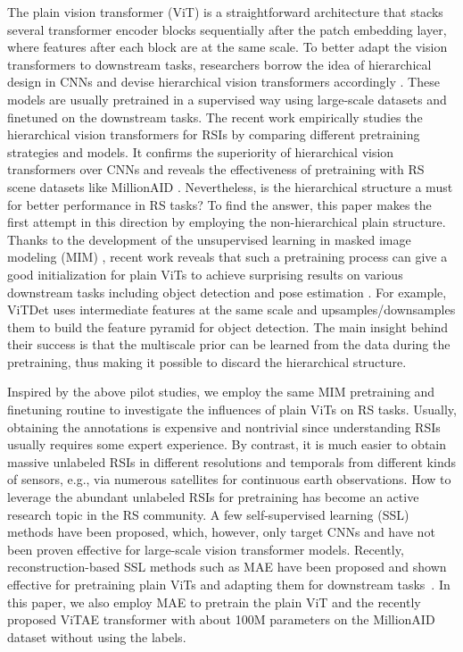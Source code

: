 \documentclass[10pt, journal,twoside]{IEEEtran}
\begin{document}
The plain vision transformer (ViT) \cite{vit} is a straightforward architecture that stacks several transformer encoder blocks sequentially after the patch embedding layer, where features after each block are at the same scale. To better adapt the vision transformers to downstream tasks, researchers borrow the idea of hierarchical design in CNNs and devise hierarchical vision transformers accordingly \cite{swint,vitae_v2}. These models are usually pretrained in a supervised way using large-scale datasets and finetuned on the downstream tasks. The recent work \cite{wang_rsp_2022} empirically studies the hierarchical vision transformers for RSIs by comparing different pretraining strategies and models. It confirms the superiority of hierarchical vision transformers over CNNs and reveals the effectiveness of pretraining with RS scene datasets like MillionAID \cite{Long2021DiRS}. Nevertheless, is the hierarchical structure a must for better performance in RS tasks? To find the answer, this paper makes the first attempt in this direction by employing the non-hierarchical plain structure. Thanks to the development of the unsupervised learning in masked image modeling (MIM) \cite{mae}, recent work reveals that such a pretraining process can give a good initialization for plain ViTs to achieve surprising results on various downstream tasks including object detection and pose estimation \cite{vitdet,vitpose}. For example, ViTDet \cite{vitdet} uses intermediate features at the same scale and upsamples/downsamples them to build the feature pyramid for object detection. The main insight behind their success is that the multiscale prior can be learned from the data during the pretraining, thus making it possible to discard the hierarchical structure. 


Inspired by the above pilot studies, we employ the same MIM pretraining and finetuning routine to investigate the influences of plain ViTs on RS tasks. Usually, obtaining the annotations is expensive and nontrivial since understanding RSIs usually requires some expert experience. By contrast, it is much easier to obtain massive unlabeled RSIs in different resolutions and temporals from different kinds of sensors, e.g., via numerous satellites for continuous earth observations. How to leverage the abundant unlabeled RSIs for pretraining has become an active research topic in the RS community. A few self-supervised learning (SSL) methods \cite{seco, geography_aware} have been proposed, which, however, only target CNNs and have not been proven effective for large-scale vision transformer models. Recently, reconstruction-based SSL methods such as MAE \cite{mae} have been proposed and shown effective for pretraining plain ViTs and adapting them for downstream tasks~\cite{vitdet,vitpose}. In this paper, we also employ MAE to pretrain the plain ViT and the recently proposed ViTAE transformer with about 100M parameters on the MillionAID dataset without using the labels.
\end{document}
